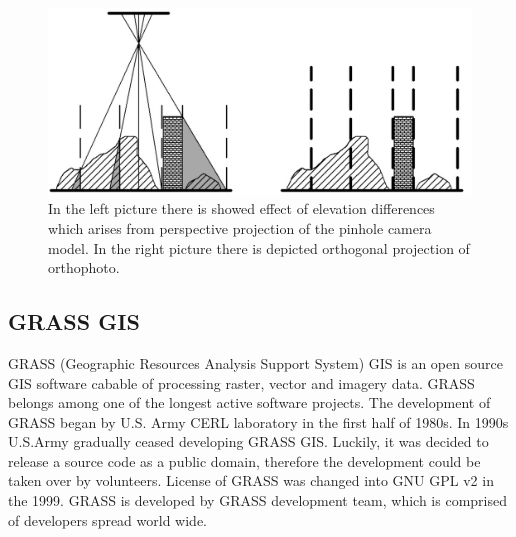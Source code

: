 \documentclass[a4paper,12pt]{article}
\begin{document}

\begin{figure}[h]
    \centering
    \includegraphics[scale=0.2]{figures/orthophoto.png}
    \caption{In the left picture there is showed effect of elevation differences 
    which arises from perspective projection of the pinhole camera model. 
    In the right picture there is depicted orthogonal projection of orthophoto.}
    \label{fig:ortho}
\end{figure}


\subsection{GRASS GIS}


GRASS (Geographic Resources Analysis Support System) GIS is an open source GIS software cabable of processing raster, vector and imagery data. 
GRASS belongs among one of 
the longest active software projects. The development of GRASS began by U.S. Army CERL  laboratory
in the first half of 1980s. In 1990s U.S.Army gradually ceased developing GRASS GIS. Luckily, it was decided to 
release a source code as a public domain, therefore the development could be taken over by volunteers.  License 
of GRASS was changed into GNU GPL v2 in the 1999. GRASS is developed by GRASS development 
team, which is comprised of developers spread world wide. 

\end{document}
